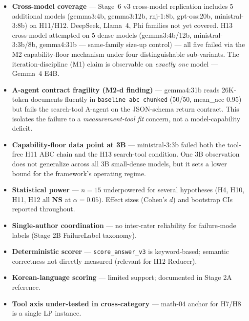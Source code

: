 \documentclass[11pt]{article}
\newcommand{\code}[1]{\texttt{#1}}
\newcommand{\NS}{\textbf{NS}}
\begin{document}
\begin{itemize}[leftmargin=*]
\item \textbf{Cross-model coverage} --- Stage~6 v3 cross-model replication includes 5 additional models (gemma3:4b, gemma3:12b, rnj-1:8b, gpt-oss:20b, ministral-3:8b) on H11/H12. DeepSeek, Llama~4, Phi families not yet covered. H13 cross-model attempted on 5 dense models (gemma3:4b/12b, ministral-3:3b/8b, gemma4:31b --- same-family size-up control) --- all five failed via the M2 capability-floor mechanism under four distinguishable sub-variants. The iteration-discipline (M1) claim is observable on \emph{exactly one} model --- Gemma~4 E4B.

\item \textbf{A-agent contract fragility (M2-d finding)} --- gemma4:31b reads 26K-token documents fluently in \code{baseline\_abc\_chunked} (50/50, mean\_acc 0.95) but fails the search-tool A-agent on the JSON-schema return contract. This isolates the failure to a \emph{measurement-tool fit} concern, not a model-capability deficit.

\item \textbf{Capability-floor data point at 3B} --- ministral-3:3b failed both the tool-free H11 ABC chain and the H13 search-tool condition. One 3B observation does not generalize across all 3B small-dense models, but it sets a lower bound for the framework's operating regime.

\item \textbf{Statistical power} --- $n\!=\!15$ underpowered for several hypotheses (H4, H10, H11, H12 all \NS{} at $\alpha\!=\!0.05$). Effect sizes (Cohen's $d$) and bootstrap CIs reported throughout.

\item \textbf{Single-author coordination} --- no inter-rater reliability for failure-mode labels (Stage 2B FailureLabel taxonomy).

\item \textbf{Deterministic scorer} --- \code{score\_answer\_v3} is keyword-based; semantic correctness not directly measured (relevant for H12 Reducer).

\item \textbf{Korean-language scoring} --- limited support; documented in Stage 2A reference.

\item \textbf{Tool axis under-tested in cross-category} --- math-04 anchor for H7/H8 is a single LP instance.
\end{itemize}
\end{document}

